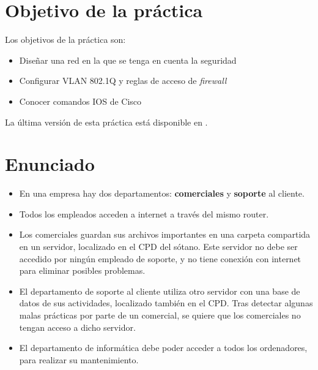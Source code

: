 
\usepackage{eurosym}


\renewcommand{\hmwkClass}{Planificación y Administración de Redes}
\renewcommand{\hmwkTitle}{Práctica VLAN en Cisco}









\primerapagina

\setlength{\parindent}{0em}
\setlength{\parskip}{1em}


\section{Objetivo de la práctica}
Los objetivos de la práctica son:
\begin{itemize}
\item Diseñar una red en la que se tenga en cuenta la seguridad
\item Configurar VLAN 802.1Q y reglas de acceso de \textit{firewall}
\item Conocer comandos IOS de Cisco
\end{itemize}


La última versión de esta práctica está disponible en .


\section{Enunciado}
\begin{itemize}
\item En una empresa hay dos departamentos: \textbf{comerciales} y \textbf{soporte} al cliente.
\item Todos los empleados acceden a internet a través del mismo router.
\item Los comerciales guardan sus archivos importantes en una carpeta compartida en un servidor, localizado en el CPD del sótano. Este servidor no debe ser accedido por ningún empleado de soporte, y no tiene conexión con internet para eliminar posibles problemas.
\item El departamento de soporte al cliente utiliza otro servidor con una base de datos de sus actividades, localizado también en el CPD. Tras detectar algunas malas prácticas por parte de un comercial, se quiere que los comerciales no tengan acceso a dicho servidor.
\item El departamento de informática debe poder acceder a todos los ordenadores, para realizar su mantenimiento.
\end{itemize}

